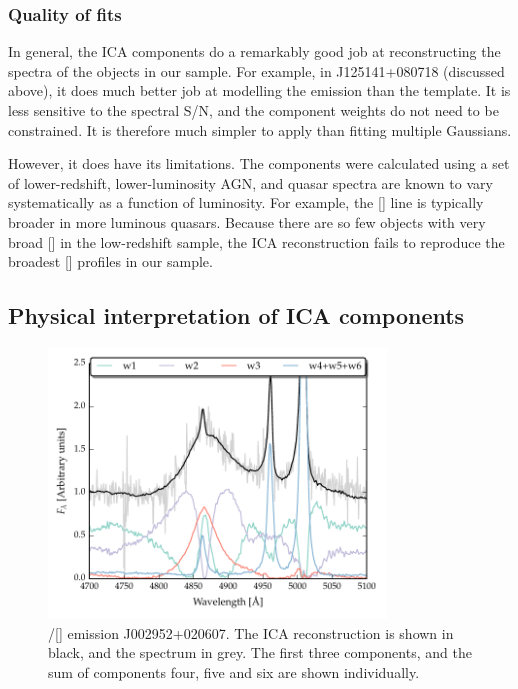 \subsubsection{Quality of fits}

In general, the \ac{ICA} components do a remarkably good job at reconstructing the spectra of the objects in our sample. 
For example, in J125141+080718 (discussed above), it does much better job at modelling the  emission than the \citet{boroson92} template. 
It is less sensitive to the spectral \ac{S/N}, and the component weights do not need to be constrained. 
It is therefore much simpler to apply than fitting multiple Gaussians. 

However, it does have its limitations. 
The components were calculated using a set of lower-redshift, lower-luminosity \ac{AGN}, and quasar spectra are known to vary systematically as a function of luminosity. 
For example, the [] line is typically broader in more luminous quasars. 
Because there are so few objects with very broad [] in the low-redshift sample, the \ac{ICA} reconstruction fails to reproduce the broadest [] profiles in our sample. 

\subsection{Physical interpretation of \ac{ICA} components}

\begin{figure}
    \centering
    \includegraphics[width=0.8\textwidth]{figures/chapter04/mfica_components.pdf} 
    \caption{\hbns/[] emission J002952+020607. The \ac{ICA} reconstruction is shown in black, and the spectrum in grey. The first three components, and the sum of components four, five and six are shown individually.}     
    \label{fig:mfica_components}
\end{figure}

